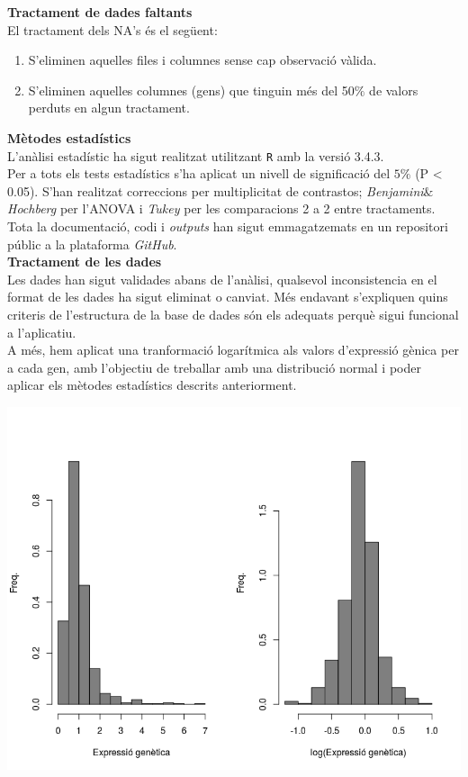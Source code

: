 \documentclass[english]{article}
\begin{document}
\newpage
\noindent\textbf{Tractament de dades faltants}\\
El tractament dels NA’s és el següent:
\begin{enumerate}
\item S’eliminen aquelles files i columnes sense cap observació vàlida.
\item S’eliminen aquelles columnes (gens) que tinguin més del 50$\%$ de valors perduts en algun tractament.
\end{enumerate}
\noindent\textbf{Mètodes estadístics}\\
L'anàlisi estadístic ha sigut realitzat utilitzant \texttt{R} amb la versió 3.4.3.
\\

Per a tots els tests estadístics s'ha aplicat un nivell de significació del $5\%$ (P < 0.05). S'han realitzat correccions per multiplicitat de contrastos; \textit{Benjamini$\&$Hochberg} per l'ANOVA i \textit{Tukey} per les comparacions 2 a 2 entre tractaments.
\\

Tota la documentació, codi i \textit{outputs} han sigut emmagatzemats en un repositori públic a la plataforma \textit{GitHub}.\\
\noindent\textbf{Tractament de les dades}\\
Les dades han sigut validades abans de l'anàlisi, qualsevol inconsistencia en el format de les dades ha sigut eliminat o canviat. Més endavant s'expliquen quins criteris de l'estructura de la base de dades són els adequats perquè sigui funcional a l'aplicatiu.
\\

A més, hem aplicat una tranformació logarítmica als valors d'expressió gènica per a cada gen, amb l'objectiu de treballar amb una distribució normal i poder aplicar els mètodes estadístics descrits anteriorment.
\begin{center}
\includegraphics[scale=0.45]{logsdades.png}
\end{center}
\clearpage
\end{document}
